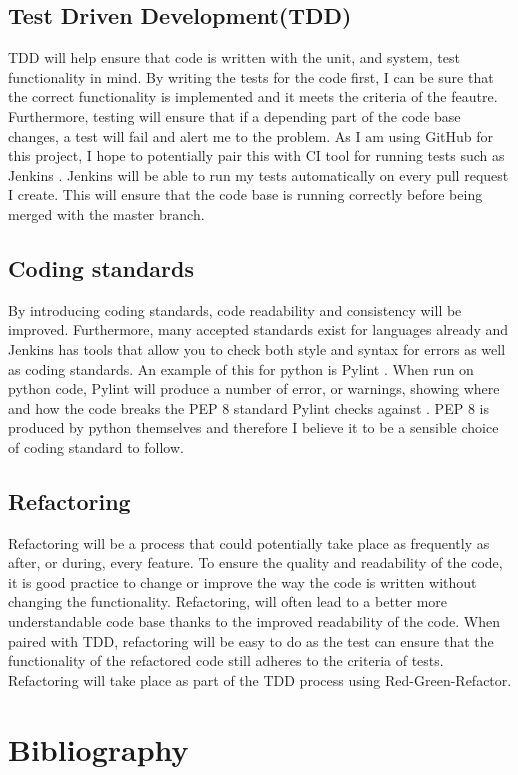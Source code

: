 \documentclass{article}
\begin{document}
\subsection{Test Driven Development(TDD)}
TDD will help ensure that code is written with the unit, and system, test functionality in mind. By writing the tests for the code first, I can be sure that the correct functionality is implemented and it meets the criteria of the feautre. Furthermore, testing will ensure that if a depending part of the code base changes, a test will fail and alert me to the problem. As I am using GitHub for this project, I hope to potentially pair this with CI tool for running tests such as Jenkins \cite{jenkins}. Jenkins will be able to run my tests automatically on every pull request I create. This will ensure that the code base is running correctly before being merged with the master branch.

\subsection{Coding standards}
By introducing coding standards, code readability and consistency will be improved. Furthermore, many accepted standards exist for languages already and Jenkins has tools that allow you to check both style and syntax for errors as well as coding standards. An example of this for python is Pylint \cite{pylint}. When run on python code, Pylint will produce a number of error, or warnings, showing where and how the code breaks the PEP 8 standard Pylint checks against \cite{pep8}. PEP 8 is produced by python themselves and therefore I believe it to be a sensible choice of coding standard to follow.

\subsection{Refactoring}
Refactoring will be a process that could potentially take place as frequently as after, or during, every feature. To ensure the quality and readability of the code, it is good practice to change or improve the way the code is written without changing the functionality. Refactoring, will often lead to a better more understandable code base thanks to the improved readability of the code. When paired with TDD, refactoring will be easy to do as the test can ensure that the functionality of the refactored code still adheres to the criteria of tests. Refactoring will take place as part of the TDD process using Red-Green-Refactor.


\nocite{*} %

\newpage


\section{Bibliography}
\end{document}

